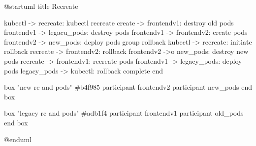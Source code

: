 @startuml
title Recreate

kubectl -> recreate: kubectl recreate
create -> frontendv1: destroy old pods
frontendv1 -> legacu_pods: destroy pods
frontendv1 -> frontendv2: create pods
frontendv2 -> new_pods: deploy pods
group rollback
  kubectl -> recreate: initiate rollback
  recreate -> frontendv2: rollback
  frontendv2 ->o new_pods: destroy new pods
  recreate -> frontendv1: recreate pods
  frontendv1 -> legacy_pods: deploy pods
  legacy_pods -> kubectl: rollback complete
end

box "new rc and pods" #b4f985
  participant frontendv2
  participant new_pods
end box

box "legacy rc and pods" #adb1f4
  participant frontendv1
  participant old_pods
end box

@enduml
